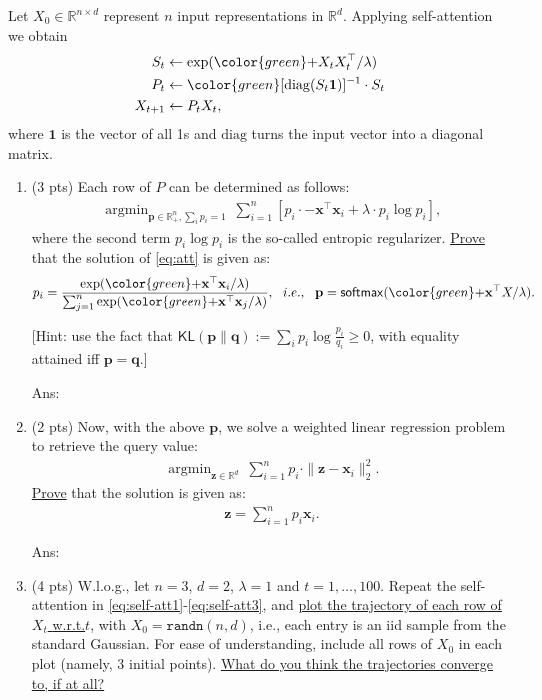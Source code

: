 \documentclass[10pt]{article}
\newcommand{\softmax}{\mathsf{softmax}}
\newcommand{\KL}{\mathsf{KL}}
\newcommand{\pv}{\mathbf{p}}
\newcommand{\qv}{\mathbf{q}}
\newcommand{\xv}{\mathbf{x}}
\newcommand{\zv}{\mathbf{z}}
\newcommand{\RR}{\mathds{R}}
\newcommand{\ans}[1]{{\color{blue}\textsf{Ans}: #1}}
\newcommand{\argmin}{\mathop{\mathrm{argmin}}}
\newcommand{\diag}{\mathrm{diag}}
\newcommand{\one}{\mathbf{1}}
\newcommand{\ie}{{i.e.}\xspace}
\newcommand{\wrt}{{w.r.t.}\xspace}
\newcommand{\green}[1]{{\color{green}#1}}
\begin{document}
	\begin{exercise}
	Let $X_0 \in \RR^{n \times d}$ represent $n$ input representations in $\RR^d$. Applying self-attention we obtain 
	\begin{align}
	    \label{eq:self-att1}
	    S_t &\gets \exp(\green{+}X_t X_t^\top / \lambda) \\
	    \label{eq:self-att2}
	    P_t &\gets \green{[\diag(S_t\one)]^{-1} \cdot S_t} \\
	    \label{eq:self-att3}
	    X_{t+1} &\gets P_t X_t,
	\end{align}
	where $\one$ is the vector of all 1s and $\diag$ turns the input vector into a diagonal matrix. 
	
	\begin{enumerate}
	\item (3 pts) Each row of $P$ can be determined as follows:
    \begin{align}
    \label{eq:att}
    \argmin_{\pv\in \RR_+^n, \sum_i p_i = 1} ~ \sum_{i=1}^n \left [p_i \cdot -\xv^\top \xv_i + \lambda \cdot p_i \log p_i \right],
    \end{align}
    where the second term $p_i\log p_i$ is the so-called entropic regularizer. \uline{Prove} that the solution of \eqref{eq:att} is given as:
    \begin{align}
    \label{eq:attsoftmax}
    p_i = \frac{\exp(\green{+}\xv^\top \xv_i/\lambda)}{\sum_{j=1}^n\exp(\green{+}\xv^\top \xv_j/\lambda)}, ~~\ie,~~ \pv = \softmax( \green{+}\xv^\top  X /\lambda ).
    \end{align}
    
    [Hint: use the fact that $\KL(\pv \| \qv) := \sum_i p_i \log\tfrac{p_i}{q_i} \geq 0$, with equality attained iff $\pv = \qv$.]
    
    \ans{\vskip6cm}
    
    \item (2 pts) Now, with the above $\pv$, we solve a weighted linear regression problem to retrieve the query value:
    \begin{align}
    \argmin_{\zv \in \RR^d} ~ \sum_{i=1}^n p_i \cdot \|\zv - \xv_i\|_2^2.
    \end{align}
    \uline{Prove} that the solution is given as: 
    \begin{align}
        \zv = \sum_{i=1}^n p_i \xv_i.
    \end{align}
    
    \ans{\vskip4cm}

    \item (4 pts) W.l.o.g., let $n=3$, $d=2$, $\lambda = 1$ and $t=1, \ldots, 100$. Repeat the self-attention in \eqref{eq:self-att1}-\eqref{eq:self-att3}, and \uline{plot the trajectory of each row of $X_t$ \wrt $t$}, with $X_0 = \mathtt{randn}(n,d)$,  i.e., each entry is an iid sample from the standard Gaussian. For ease of understanding, include all rows of $X_0$ in each plot (namely, 3 initial points). \uline{What do you think the trajectories converge to, if at all?}
	

\end{enumerate}
\end{exercise}
\end{document}
